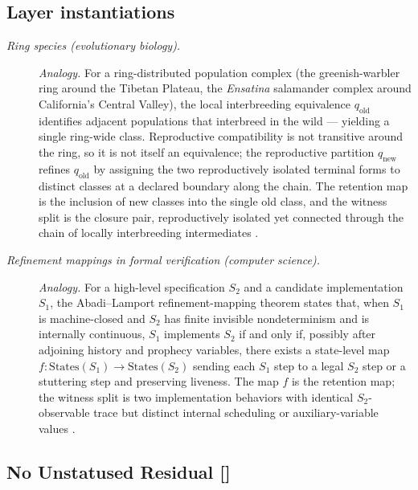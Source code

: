 \subsection*{Layer instantiations}\label{layer-inst:F8}

\begingroup\small
\begin{description}
\item[\emph{Ring species (evolutionary biology).}] \textit{Analogy.}
For a ring-distributed population complex (the greenish-warbler ring around the Tibetan Plateau, the
\emph{Ensatina} salamander complex around California's Central
Valley), the local interbreeding equivalence
\(q_{\mathrm{old}}\) identifies adjacent populations that interbreed
in the wild --- yielding a single ring-wide class.  Reproductive compatibility is not
transitive around the ring, so it is not itself an equivalence; the
reproductive partition \(q_{\mathrm{new}}\) refines
\(q_{\mathrm{old}}\) by assigning the two reproductively isolated
terminal forms to distinct classes at a declared boundary along the
chain.  The
retention map is the inclusion of new classes into the single old
class, and the witness split is the closure pair, reproductively
isolated yet connected through the chain of locally interbreeding
intermediates \citep{IrwinBenschPrice2001SpeciationInARing}.

\item[\emph{Refinement mappings in formal verification (computer
science).}] \textit{Analogy.}
For a high-level specification \(S_2\) and a candidate implementation
\(S_1\), the Abadi--Lamport refinement-mapping theorem states that, when
\(S_1\) is machine-closed and \(S_2\) has finite invisible
nondeterminism and is internally continuous, \(S_1\) implements
\(S_2\) if and only if, possibly after adjoining history and prophecy
variables, there exists a state-level map
\(f:\mathrm{States}(S_1)\to\mathrm{States}(S_2)\) sending each \(S_1\)
step to a legal \(S_2\) step or a stuttering step and preserving
liveness.  The map \(f\) is the  retention map;
the witness split is two implementation behaviors with identical
\(S_2\)-observable trace but distinct internal scheduling or
auxiliary-variable values
\citep{AbadiLamport1991RefinementMappings}.

\end{description}
\endgroup


\subsection{No Unstatused Residual [\texorpdfstring{}{F9}]}\label{sec:stability:no-unstatused-residual}

